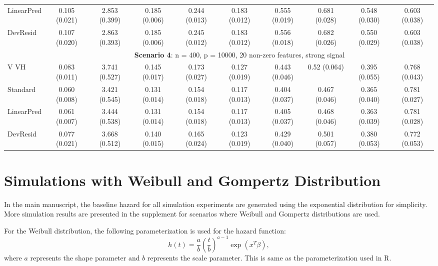 \documentclass{article}
\begin{document}
\begin{landscape}
\begin{table}[ht]
\begin{tabular}[t]{lccccccccc}
 LinearPred  & 0.105 (0.021) & 2.853 (0.399) & 0.185 (0.006) & 0.244 (0.013) & 0.183 (0.012) & 0.555 (0.019) & 0.681 (0.028) & 0.548 (0.030) & 0.603 (0.038) \\
 DevResid  & 0.107 (0.020) & 2.863 (0.393) & 0.185 (0.006) & 0.245 (0.012) & 0.183 (0.012) & 0.556 (0.018) & 0.682 (0.026) & 0.550 (0.029) & 0.603 (0.038) \\
\addlinespace
&\multicolumn{9}{c}{\textbf{Scenario 4}: n = 400, p = 10000, 20 non-zero features, strong signal}\\
\cline{2-10}
 V VH  & 0.083 (0.011) & 3.741 (0.527) & 0.145 (0.017) & 0.173 (0.027) & 0.127 (0.019) & 0.443 (0.046) & 0.52 (0.064) & 0.395 (0.055) & 0.768 (0.043) \\
 Standard  & 0.060 (0.008) & 3.421 (0.545) & 0.131 (0.014) & 0.154 (0.018) & 0.117 (0.013) & 0.404 (0.037) & 0.467 (0.046) & 0.365 (0.040) & 0.781 (0.027) \\
 LinearPred  & 0.061 (0.007) & 3.444 (0.538) & 0.131 (0.014) & 0.154 (0.018) & 0.117 (0.013) & 0.405 (0.037) & 0.468 (0.046) & 0.363 (0.039) & 0.781 (0.028) \\ 
 DevResid  & 0.077 (0.021) & 3.668 (0.512) & 0.140 (0.015) & 0.165 (0.024) & 0.123 (0.019) & 0.429 (0.040) & 0.501 (0.057) & 0.380 (0.053) & 0.772 (0.053) \\
\bottomrule
\end{tabular}
\end{table}


\section{Simulations with Weibull and Gompertz Distribution}

In the main manuscript, the baseline hazard for all simulation experiments are generated using the exponential distribution for simplicity. More simulation results are presented in the supplement for scenarios where Weibull and Gompertz distributions are used.

For the Weibull distribution, the following parameterization is used for the hazard function:
$$h(t) = \frac{a}{b}(\frac{t}{b})^{a - 1}\exp{(x^{T}\beta)}, $$
where $a$ represents the shape parameter and $b$ represents the scale parameter. This is same as the parameterization used in R.




\end{landscape}
\end{document}
